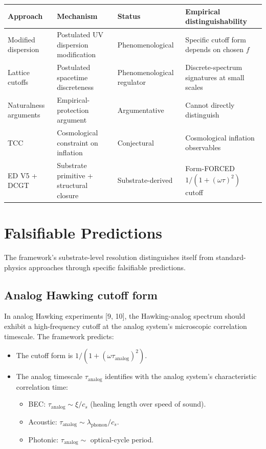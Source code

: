 \documentclass[11pt,a4paper]{article}
\begin{document}
\begin{center}
\begin{tabular}{p{}p{}p{}p{}}
\toprule
\textbf{Approach} & \textbf{Mechanism} & \textbf{Status} & \textbf{Empirical distinguishability} \\
\midrule
Modified dispersion & Postulated UV dispersion modification & Phenomenological & Specific cutoff form depends on chosen $f$ \\
Lattice cutoffs & Postulated spacetime discreteness & Phenomenological regulator & Discrete-spectrum signatures at small scales \\
Naturalness arguments & Empirical-protection argument & Argumentative & Cannot directly distinguish \\
TCC & Cosmological constraint on inflation & Conjectural & Cosmological inflation observables \\
ED V5 + DCGT & Substrate primitive + structural closure & Substrate-derived & Form-FORCED $1/(1+(\omega\tau)^{2})$ cutoff \\
\bottomrule
\end{tabular}
\end{center}

\section{Falsifiable Predictions}

The framework's substrate-level resolution distinguishes itself from standard-physics approaches through specific falsifiable predictions.

\subsection{Analog Hawking cutoff form}

In analog Hawking experiments [9, 10], the Hawking-analog spectrum should exhibit a high-frequency cutoff at the analog system's microscopic correlation timescale. The framework predicts:

\begin{itemize}[noitemsep]
\item The cutoff form is $1/(1+(\omega\tau_\mathrm{analog})^{2})$.
\item The analog timescale $\tau_\mathrm{analog}$ identifies with the analog system's characteristic correlation time:
\begin{itemize}[noitemsep]
\item BEC: $\tau_\mathrm{analog} \sim \xi/c_s$ (healing length over speed of sound).
\item Acoustic: $\tau_\mathrm{analog} \sim \lambda_\mathrm{phonon}/c_s$.
\item Photonic: $\tau_\mathrm{analog} \sim$ optical-cycle period.
\end{itemize}
\end{itemize}
\end{document}

